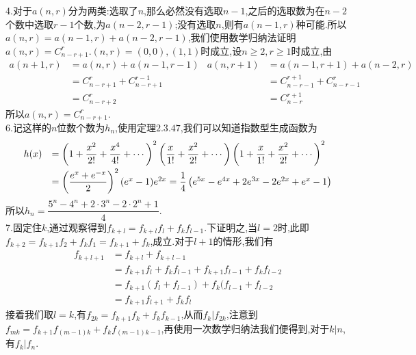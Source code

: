 \documentclass[b5paper]{ctexart}
\begin{document}
4.对于$a(n,r)$分为两类:选取了$n$,那么必然没有选取$n-1$,之后的选取数为在$n-2$个数中选取$r-1$个数,为$a(n-2,r-1)$;没有选取$n$,则有$a(n-1,r)$种可能.所以$a(n,r)=a(n-1,r)+a(n-2,r-1)$,我们使用数学归纳法证明$a(n,r)=C_{n-r+1}^r
 $.$(n,r)=(0,0),(1,1)$时成立,设$n\geq 2,r\geq 1$时成立,由
\[\begin{array}{rlrl}
a(n+1,r)& =a(n,r)+a(n-1,r-1) & a(n,r+1)&=a(n-1,r+1)+a(n-2,r)\\
&=C_{n-r+1}^r+C_{n-r+1}^{r-1}& &=C_{n-r-1}^{r+1}+C_{n-r-1}^r\\
&=C_{n-r+2}^r & &=C_{n-r}^{r+1}
\end{array}\]
所以$a(n,r)=C_{n-r+1}^r$.\\
6.记这样的$n$位数个数为$h_n$,使用定理$2.3.47$,我们可以知道指数型生成函数为
\[\begin{array}{rl}
h(x)&=\left( 1+\dfrac{x^2}{2!}+\dfrac{x^4}{4!}+\cdots\right)^2\left( \dfrac{x}{1!}+\dfrac{x^2}{2!}+\cdots\right)\left( 1+\dfrac{x}{1!}+\dfrac{x^2}{2!}+\cdots\right)^2 \vspace{3pt}\\
&=\left( \dfrac{e^x+e^{-x}}{2}\right)^2(e^x-1)e^{2x}=\dfrac{1}{4}\left(e^{5x}-e^{4x}+2e^{3x}-2e^{2x}+e^x-1 \right) 
\end{array}\]
所以$h_n=\dfrac{5^n-4^n+2\cdot 3^n-2\cdot 2^n+1}{4}$.\\
7.固定住$k$,通过观察得到$f_{k+l}=f_{k+l}f_l+f_kf_{l-1}$.下证明之,当$l=2$时,此即$f_{k+2}=f_{k+1}f_2+f_kf_1=f_{k+1}+f_k$,成立.对于$l+1$的情形,我们有\[\begin{array}{rl}
f_{k+l+1}&=f_{k+l}+f_{k+l-1}\\
 &=f_{k+1}f_l+f_kf_{l-1}
 +f_{k+1}f_{l-1}+f_kf_{l-2}\\
 &=f_{k+1}(f_l+f_{l-1})+f_k(f_{l-1}+f_{l-2}\\
 &=f_{k+1}f_{l+1}+f_kf_{l}
\end{array}\]
接着我们取$l=k$,有$f_{2k}=f_{k+1}f_k+f_kf_{k-1}$,从而$f_k|f_{2k}$,注意到$f_{mk}=f_{k+1}f_{(m-1)k}+f_kf_{(m-1)k-1}$,再使用一次数学归纳法我们便得到,对于$k|n$,有$f_k|f_n$.
\end{document}
